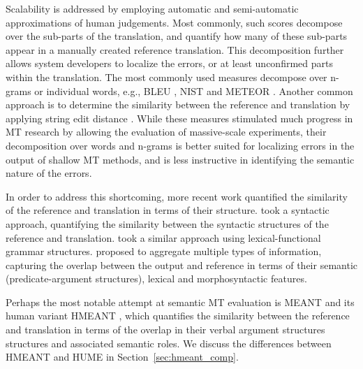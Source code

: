 \documentclass[11pt]{article}
\newcommand{\secref}[1]{Section~\ref{#1}}
\def\parcite#1{\cite{#1}}
\begin{document}
Scalability is addressed by employing automatic and semi-automatic approximations of human
judgements. Most commonly, such scores decompose over the sub-parts of
the translation, and quantify how many of these sub-parts appear in a manually created reference translation.
This decomposition further allows system developers
to localize the errors, or at least unconfirmed parts within the translation.
The most commonly used measures decompose over n-grams or individual words, e.g., 
BLEU \cite{Papineni:2002}, NIST \cite{Doddington:2002} and METEOR  \cite{Banerjee:2005}.
Another common approach is to determine the similarity between the reference and translation
by applying string edit distance \cite{snover2006study}.
While these measures stimulated much progress in MT research by allowing
the evaluation of massive-scale experiments,
their decomposition over words and n-grams is better suited for localizing errors
in the output of shallow MT methods, and is less instructive in identifying the semantic
nature of the errors. 


In order to address this shortcoming, more recent work quantified
the similarity of the reference and translation in terms
of their structure.  took a syntactic approach, 
quantifying the similarity between the syntactic structures of the reference and translation.
 took a similar approach using lexical-functional grammar structures.
 proposed to aggregate multiple types of information,
capturing the overlap between the output and reference in terms of their
semantic (predicate-argument structures), lexical and morphosyntactic features.

Perhaps the most notable attempt at semantic MT evaluation is MEANT and
its human variant HMEANT \parcite{lo2011structured}, which quantifies the similarity between
the reference and translation in terms of the overlap in
their verbal argument structures structures and associated semantic roles.
We discuss the differences between HMEANT and HUME in \secref{sec:hmeant_comp}.
\end{document}
